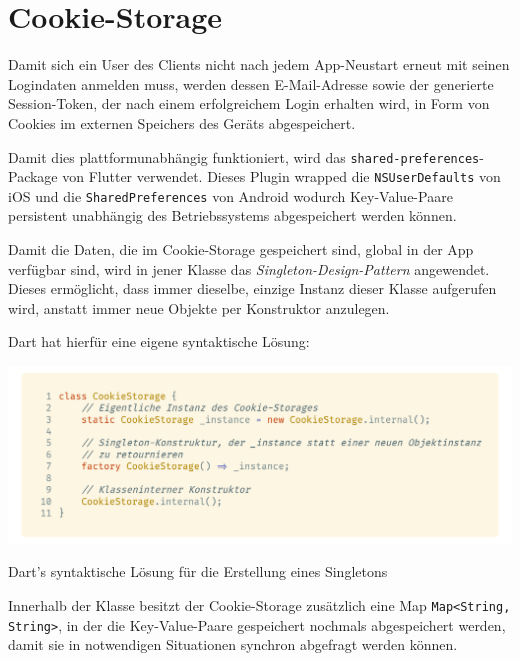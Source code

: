 \section{Cookie-Storage}

Damit sich ein User des Clients nicht nach jedem App-Neustart erneut mit seinen Logindaten anmelden muss,
werden dessen E-Mail-Adresse sowie der generierte Session-Token, der nach einem erfolgreichem Login erhalten wird, 
in Form von Cookies im externen Speichers des Geräts abgespeichert.


Damit dies plattformunabhängig funktioniert, wird das \lstinline{shared-preferences}-Package von Flutter
verwendet.
Dieses Plugin wrapped die \lstinline{NSUserDefaults} von iOS und die \lstinline{SharedPreferences} von Android
wodurch Key-Value-Paare persistent unabhängig des Betriebssystems abgespeichert werden können.

Damit die Daten, die im Cookie-Storage gespeichert sind, global in der App verfügbar sind, wird in jener
Klasse das \textit{Singleton-Design-Pattern} angewendet. Dieses ermöglicht, dass immer dieselbe, einzige Instanz
dieser Klasse aufgerufen wird, anstatt immer neue Objekte per Konstruktor anzulegen.

\newpage

Dart hat hierfür eine eigene syntaktische Lösung:

\begin{code}
    \centering
    \includegraphics[width=1\textwidth]{images/Client/util/cookie-storage/cookieStorageSingleton.png}
    \caption{Dart's syntaktische Lösung für die Erstellung eines Singletons}
\end{code}

Innerhalb der Klasse besitzt der Cookie-Storage zusätzlich eine Map \lstinline{Map<String, String>}, in der die Key-Value-Paare
gespeichert nochmals abgespeichert werden, damit sie in notwendigen Situationen synchron abgefragt werden können.

